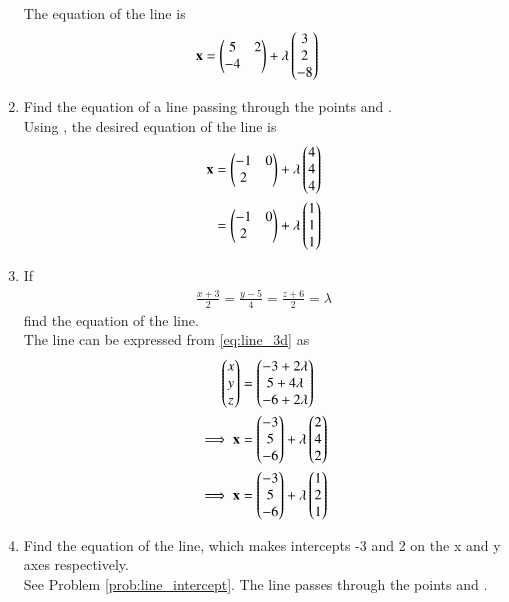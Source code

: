 \begin{enumerate}[label=\arabic*.,ref=\thesubsection.\theenumi]
\\
\solution The equation of the line is 
\begin{align}
\mathbf{x} &= \begin{pmatrix}5 & 2\\-4\end{pmatrix} + \lambda \begin{pmatrix}3\\2\\-8\end{pmatrix}
\end{align}
%
\item Find the equation of a line passing through the points  and .
\\
\solution Using  \label{eq:line_two_pt}, the desired equation of the line is
\begin{align}
\mathbf{x} &= \begin{pmatrix}-1 & 0\\2\end{pmatrix} + \lambda \begin{pmatrix}4\\4\\4\end{pmatrix}
\\
&= \begin{pmatrix}-1 & 0\\2\end{pmatrix} + \lambda \begin{pmatrix}1\\1\\1\end{pmatrix}
\end{align}
%
\item If
\begin{align}
%
\label{eq:line_3d}
\frac{x+3}{2} = \frac{y-5}{4} = \frac{z+6}{2} = \lambda
\end{align}
%
find the equation of the line.
\label{prob:line_3d}
\\
\solution The line can be expressed from \eqref{eq:line_3d} as
%
\begin{align}
\label{eq:line_3d}
\begin{pmatrix}x\\y\\z\end{pmatrix} &= \begin{pmatrix}-3+2\lambda\\5+4\lambda\\-6+2\lambda\end{pmatrix}
\\
\implies \mathbf{x} &= \begin{pmatrix}-3\\5\\-6\end{pmatrix} + \lambda \begin{pmatrix}2\\4\\2\end{pmatrix}
\\
\implies \mathbf{x} &= \begin{pmatrix}-3\\5\\-6\end{pmatrix} + \lambda \begin{pmatrix}1\\2\\1\end{pmatrix}
\end{align}
%
\item Find the equation of the line, which makes intercepts -3 and 2 on the x and y axes respectively.
\\
\solution See Problem \ref{prob:line_intercept}.  The line passes through the points  and .


\end{enumerate}
